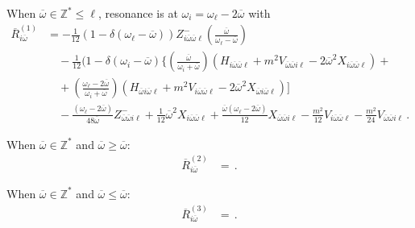 \documentclass[letterpaper,11pt]{article}
\newcommand{\oi}{\omega_i}
\newcommand{\ol}{\omega_\ell}
\newcommand{\ob}{\overline{\omega}}
\begin{document}
When $\ob \in \mathbb{Z}^*  \leq \ell$, resonance is at $\oi = \ol - 2\ob$ with 
\begin{align}
\overline{R}^{(1)}_{i \ob} &= - \frac{1}{12} \left(1 - \delta(\ol - \ob) \right) Z^-_{i \ob \ob \ell} \left(\frac{\ob}{\ol - \ob} \right) \nonumber \\
%
& \quad - \frac{1}{12} (1 - \delta(\oi - \ob) \Big \{ \left( \frac{\ob}{\oi + \ob} \right) \left(H_{i\ob\ob\ell} + m^2 V_{\ob\ob i \ell} - 2\ob^2 X_{i\ob\ob\ell} \right) + \nonumber \\
%
& \quad + \left( \frac{\ol - 2\ob}{\oi + \ob} \right) \left( H_{\ob i \ob \ell} + m^2 V_{i \ob \ob \ell} - 2 \ob^2 X_{\ob i \ob \ell} \right) \Big] \nonumber \\
%
& \quad - \frac{(\ol - 2\ob)}{48\ob} Z^-_{\ob\ob i \ell} + \frac{1}{12} \ob^2 X_{i \ob \ob \ell} + \frac{\ob (\ol - 2\ob)}{12} X_{\ob\ob i \ell} - \frac{m^2}{12} V_{i\ob\ob\ell} - \frac{m^2}{24} V_{\ob\ob i \ell} \, .
\end{align}

When $\ob \in \mathbb{Z}^*$ and $\ob \geq \ob$:
\begin{align}
\overline{R}^{(2)}_{i \ob} &= \, .
\end{align}

When $\ob \in \mathbb{Z}^*$ and $\ob \leq \ob$:
\begin{align}
\overline{R}^{(3)}_{i\ob} &= \, .
\end{align}







\end{document}
